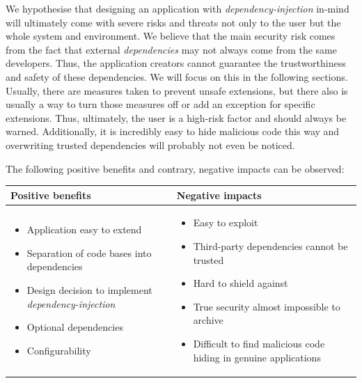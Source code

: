 We hypothesise that designing an application with \textit{dependency-injection} in-mind will ultimately come with severe risks and threats not only to the user but the whole system and environment.
We believe that the main security risk comes from the fact that external \textit{dependencies} may not always come from the same developers.
Thus, the application creators cannot guarantee the trustworthiness and safety of these dependencies.
We will focus on this in the following sections.
Usually, there are measures taken to prevent unsafe extensions, but there also is usually a way to turn those measures off or add an exception for specific extensions.
Thus, ultimately, the user is a high-risk factor and should always be warned.
Additionally, it is incredibly easy to hide malicious code this way and overwriting trusted dependencies will probably not even be noticed.

The following positive benefits and contrary, negative impacts can be observed:
\begin{center}
    \begin{tabular}{|p{}|p{}|}
        \hline
        \textbf{Positive benefits} & \textbf{Negative impacts} \\\hline
        \begin{itemize}
            \item Application easy to extend
            \item Separation of code bases into dependencies
            \item Design decision to implement \textit{dependency-injection}
            \item Optional dependencies
            \item Configurability\footnotemark[1]
        \end{itemize} &
        \begin{itemize}
            \item Easy to exploit
            \item Third-party dependencies cannot be trusted
            \item Hard to shield against
            \item True security almost impossible to archive
            \item Difficult to find malicious code hiding in genuine applications
        \end{itemize}
        \\\hline
    \end{tabular}
\end{center}
